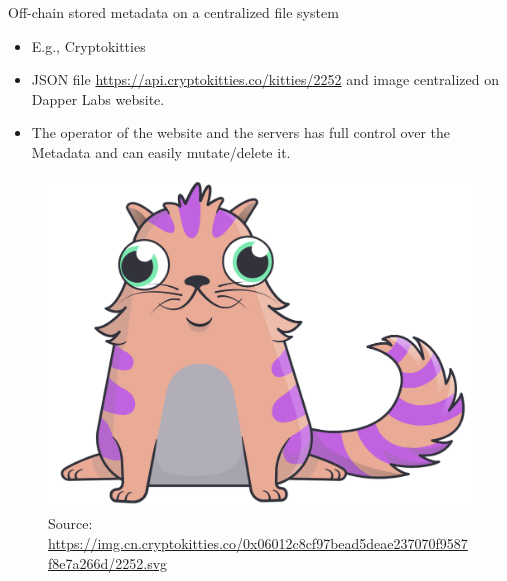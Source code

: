 \documentclass[handout]{beamer}
\begin{document}
\begin{frame}{Off-chain stored metadata on a centralized file system}
\begin{itemize}
	\item E.g., Cryptokitties
	\item JSON file \link \href{https://api.cryptokitties.co/kitties/2252}{https://api.cryptokitties.co/kitties/2252} and image centralized on Dapper Labs website.
	\item The operator of the website and the servers has full control over the Metadata and can easily mutate/delete it.
\end{itemize}
\vspace{1em}
\begin{figure}
	\centering
	\includegraphics[scale=0.2]{../assets/images/cryptokitty.png}
	\caption*{Source: \link \href{https://img.cn.cryptokitties.co/0x06012c8cf97bead5deae237070f9587f8e7a266d/2252.svg} {\tiny https://img.cn.cryptokitties.co/0x06012c8cf97bead5deae237070f9587f8e7a266d/2252.svg}	}
\end{figure}
\end{frame}
\end{document}
